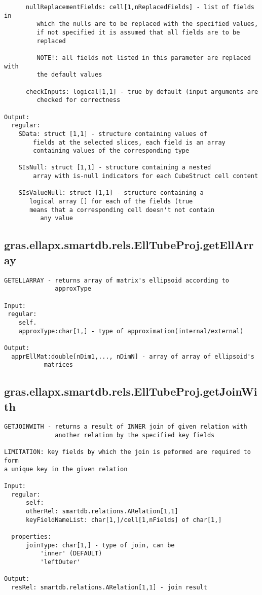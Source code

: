 \begin{verbatim}
      nullReplacementFields: cell[1,nReplacedFields] - list of fields in
         which the nulls are to be replaced with the specified values,
         if not specified it is assumed that all fields are to be
         replaced

         NOTE!: all fields not listed in this parameter are replaced with
         the default values

      checkInputs: logical[1,1] - true by default (input arguments are
         checked for correctness

Output:
  regular:
    SData: struct [1,1] - structure containing values of
        fields at the selected slices, each field is an array
        containing values of the corresponding type

    SIsNull: struct [1,1] - structure containing a nested
        array with is-null indicators for each CubeStruct cell content

    SIsValueNull: struct [1,1] - structure containing a
       logical array [] for each of the fields (true
       means that a corresponding cell doesn't not contain
          any value
\end{verbatim}
\subsection{\texorpdfstring{gras.ellapx.smartdb.rels.EllTubeProj.getEllArray}{getEllArray}}\label{method:gras.ellapx.smartdb.rels.EllTubeProj.getEllArray}
\begin{verbatim}
GETELLARRAY - returns array of matrix's ellipsoid according to
              approxType

Input:
 regular:
    self.
    approxType:char[1,] - type of approximation(internal/external)

Output:
  apprEllMat:double[nDim1,..., nDimN] - array of array of ellipsoid's
           matrices
\end{verbatim}
\subsection{\texorpdfstring{gras.ellapx.smartdb.rels.EllTubeProj.getJoinWith}{getJoinWith}}\label{method:gras.ellapx.smartdb.rels.EllTubeProj.getJoinWith}
\begin{verbatim}
GETJOINWITH - returns a result of INNER join of given relation with
              another relation by the specified key fields

LIMITATION: key fields by which the join is peformed are required to form
a unique key in the given relation

Input:
  regular:
      self:
      otherRel: smartdb.relations.ARelation[1,1]
      keyFieldNameList: char[1,]/cell[1,nFields] of char[1,]

  properties:
      joinType: char[1,] - type of join, can be
          'inner' (DEFAULT)
          'leftOuter'

Output:
  resRel: smartdb.relations.ARelation[1,1] - join result
\end{verbatim}
